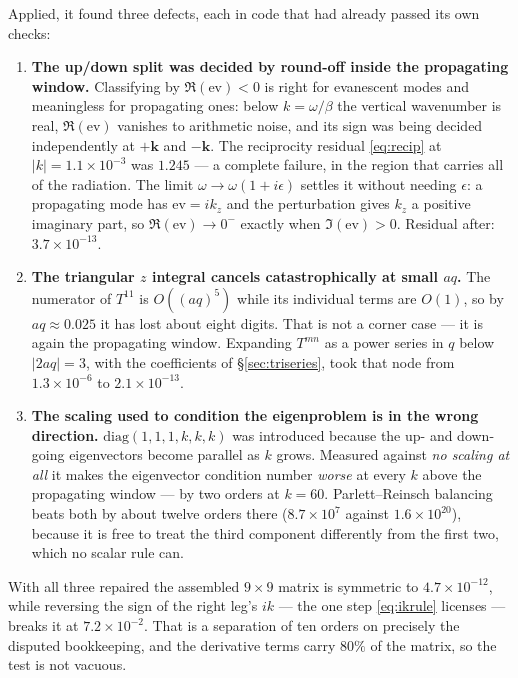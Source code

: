 \documentclass[11pt,a4paper]{article}
\begin{document}
Applied, it found three defects, each in code that had already passed its own
checks:

\begin{enumerate}
\item \textbf{The up/down split was decided by round-off inside the propagating
      window.}  Classifying by $\Re(\text{ev}) < 0$ is right for evanescent modes
      and meaningless for propagating ones: below $k = \omega/\beta$ the vertical
      wavenumber is real, $\Re(\text{ev})$ vanishes to arithmetic noise, and its
      sign was being decided independently at $+\mathbf{k}$ and $-\mathbf{k}$.
      The reciprocity residual \eqref{eq:recip} at $|k| = 1.1\times10^{-3}$ was
      $1.245$ --- a complete failure, in the region that carries all of the
      radiation.  The limit $\omega \to \omega(1+i\epsilon)$ settles it without
      needing $\epsilon$: a propagating mode has $\text{ev} = ik_z$ and the
      perturbation gives $k_z$ a positive imaginary part, so $\Re(\text{ev})\to0^-$
      exactly when $\Im(\text{ev}) > 0$.  Residual after: $3.7\times10^{-13}$.
\item \textbf{The triangular $z$ integral cancels catastrophically at small
      $aq$.}  The numerator of $T^{11}$ is $O((aq)^5)$ while its individual terms
      are $O(1)$, so by $aq \approx 0.025$ it has lost about eight digits.  That
      is not a corner case --- it is again the propagating window.  Expanding
      $T^{mn}$ as a power series in $q$ below $|2aq| = 3$, with the coefficients
      of \S\ref{sec:triseries}, took that node from $1.3\times10^{-6}$ to
      $2.1\times10^{-13}$.
\item \textbf{The scaling used to condition the eigenproblem is in the wrong
      direction.}  $\mathrm{diag}(1,1,1,k,k,k)$ was introduced because the up-
      and down-going eigenvectors become parallel as $k$ grows.  Measured against
      \emph{no scaling at all} it makes the eigenvector condition number
      \emph{worse} at every $k$ above the propagating window --- by two orders at
      $k = 60$.  Parlett--Reinsch balancing \cite{parlett1969} beats both by about twelve orders
      there ($8.7\times10^{7}$ against $1.6\times10^{20}$), because it is free to
      treat the third component differently from the first two, which no scalar
      rule can.
\end{enumerate}

With all three repaired the assembled $9\times9$ matrix is symmetric to
$4.7\times10^{-12}$, while reversing the sign of the right leg's $ik$ --- the
one step \eqref{eq:ikrule} licenses --- breaks it at $7.2\times10^{-2}$.  That is
a separation of ten orders on precisely the disputed bookkeeping, and the
derivative terms carry $80\%$ of the matrix, so the test is not vacuous.
\end{document}
